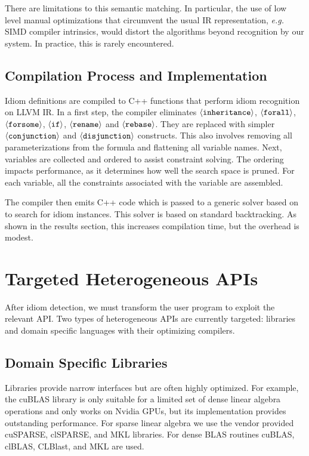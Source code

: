     There are limitations to this semantic matching.
    In particular, the use of low level manual optimizations that circumvent the
    usual IR representation, {\em e.g.}  SIMD compiler intrinsics, would distort
    the algorithms beyond recognition by our system.
    In practice, this is rarely encountered.



\subsection{Compilation Process and Implementation}
\label{sec:compilation}

    Idiom definitions are compiled to C++ functions that perform idiom
    recognition on LLVM IR.
    In a first step, the compiler eliminates
    $\left<\text{\tt inheritance}\right>$, $\left<\text{\tt forall}\right>$,
    $\left<\text{\tt forsome}\right>$, $\left<\text{\tt if}\right>$,
    $\left<\text{\tt rename}\right>$ and $\left<\text{\tt rebase}\right>$.
    They are replaced with simpler $\left<\text{\tt conjunction}\right>$ and
    $\left<\text{\tt disjunction}\right>$ constructs.
    This also involves removing all parameterizations from the formula and
    flattening all variable names.
    Next, variables are collected and ordered to assist constraint solving.
    The ordering impacts performance, as it determines how well the search space
    is pruned. 
    For each variable, all the constraints associated with the variable are
    assembled.

    The compiler then emits C++ code which is passed to a generic solver based on \cite{ginsbach2017discovery} to search for idiom instances.
    This solver is based on standard backtracking.
    As shown in the results section, this increases compilation time, but the overhead is modest.

\section{Targeted Heterogeneous APIs}

    After idiom detection, we must transform the user program to exploit the
    relevant API.
    Two types of heterogeneous APIs are currently targeted: libraries and domain
    specific languages with their optimizing compilers.

    \subsection{Domain Specific Libraries}
    Libraries provide narrow interfaces but are often highly optimized.
    For example, the cuBLAS library is only suitable for a limited set of dense
    linear algebra operations and only works on Nvidia GPUs, but its
    implementation provides outstanding performance.
    For sparse linear algebra we use the vendor provided cuSPARSE, clSPARSE, and
    MKL libraries.
    For dense BLAS routines cuBLAS, clBLAS, CLBlast, and MKL are used.

